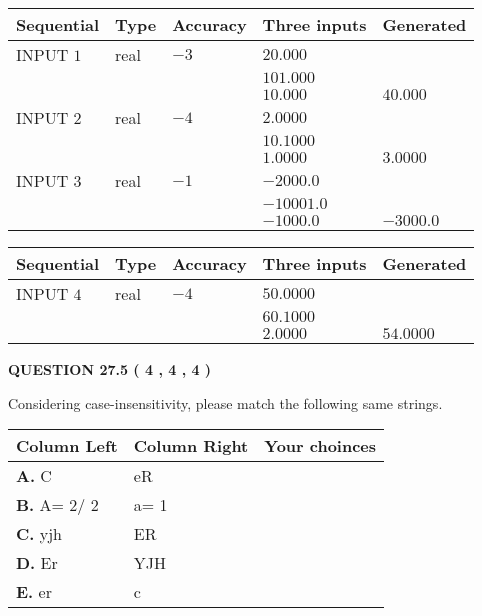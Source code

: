 \documentclass[12pt]{article}
\begin{document}
  
\noindent\begin{tabular}{|l|l|l|l|l|}
\hline
 Sequential & Type & Accuracy & Three inputs & Generated \\ 
\hline
 
 
  INPUT $            1 $ & real & $           -3  $ & $
 20.000
  $ & \\
  & & &  $
 101.000
  $ & \\
  & & &  $
 10.000
 $ & $ 40.000 $ 
 \\  \hline  
 
 
  INPUT $            2 $ & real & $           -4  $ & $
 2.0000
  $ & \\
  & & &  $
 10.1000
  $ & \\
  & & &  $
 1.0000
 $ & $ 3.0000 $ 
 \\  \hline  
 
 
  INPUT $            3 $ & real & $           -1  $ & $
 -2000.0
  $ & \\
  & & &  $
 -10001.0
  $ & \\
  & & &  $
 -1000.0
 $ & $ -3000.0 $ 
 \\  \hline  
 \end{tabular}
   
   
  
  
\noindent\begin{tabular}{|l|l|l|l|l|}
\hline
 Sequential & Type & Accuracy & Three inputs & Generated \\ 
\hline
 
 
  INPUT $            4 $ & real & $           -4  $ & $
 50.0000
  $ & \\
  & & &  $
 60.1000
  $ & \\
  & & &  $
 2.0000
 $ & $ 54.0000 $ 
 \\  \hline  
 \end{tabular}
   
   
  
\vspace{0.2in}
  
{\textbf{\Large{QUESTION
27.5 
 (           4 ,           4 ,           4 )
}}}
  
  
Considering case-insensitivity, please match the following same strings.
  
  
\begin{tabular}{|l|l|l|}
 \hline
 Column Left & Column Right  & Your choinces \\ 
 \hline
{\textbf{\large{
A.}}}
C
  & 
eR
 & 
 \\ 
 \hline
{\textbf{\large{
B.}}}
 A= %
2/ %
2

  & 
 a= %
1
 & 
 \\ 
 \hline
{\textbf{\large{
C.}}}
yjh
  & 
ER
 & 
 \\ 
 \hline
{\textbf{\large{
D.}}}
Er
  & 
YJH
 & 
 \\ 
 \hline
{\textbf{\large{
E.}}}
er
  & 
c
 & 
 \\ 
 \hline
 \end{tabular}
  
\end{document}
